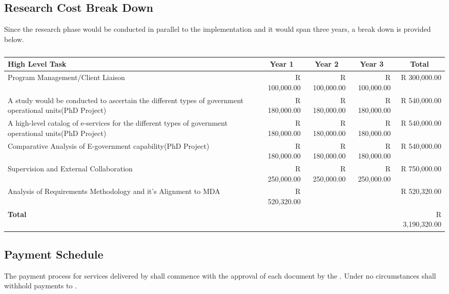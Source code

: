 \subsection{Research Cost Break Down}
Since the research phase would be conducted in parallel to the implementation and it would span three years, a break down is provided below.
\begin{table}[htbp]
\caption{}
\begin{tabular}{|p{6cm}|r|r|r|r|}
\hline
\textbf{High Level Task} & \multicolumn{1}{c|}{\textbf{Year 1}} & \multicolumn{1}{c|}{\textbf{Year 2}} & \multicolumn{1}{c|}{\textbf{Year 3}} & \multicolumn{1}{c|}{\textbf{Total}} \\ \hline
Program Management/Client Liaison & R 100,000.00 & R 100,000.00 & R 100,000.00 & R 300,000.00 \\ \hline
A study would be conducted to ascertain the different types of government operational units(PhD Project) & R 180,000.00 & R 180,000.00 & R 180,000.00 & R 540,000.00 \\ \hline
A high-level catalog of e-services for the different types of government operational units(PhD Project) & R 180,000.00 & R 180,000.00 & R 180,000.00 & R 540,000.00 \\ \hline
Comparative Analysis of E-government capability(PhD Project) & R 180,000.00 & R 180,000.00 & R 180,000.00 & R 540,000.00 \\ \hline
Supervision and External Collaboration & R 250,000.00 & R 250,000.00 & R 250,000.00 & R 750,000.00 \\ \hline
Analysis of Requirements Methodology and it's Alignment to MDA & R 520,320.00 & \multicolumn{1}{l|}{} & \multicolumn{1}{l|}{} & R 520,320.00 \\ \hline
\textbf{Total} & \multicolumn{1}{l|}{} & \multicolumn{1}{l|}{} & \multicolumn{1}{l|}{} & R 3,190,320.00 \\ \hline
\end{tabular}
\label{}
\end{table}







\subsection{Payment Schedule}
The payment process for services delivered by \vendor shall commence with the approval of each document by the \client.  Under no circumstances shall \client withhold payments to \vendor. 
